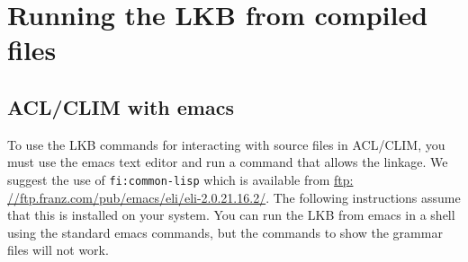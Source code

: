 \documentclass[12pt]{report}
\begin{document}
\section{Running the LKB from compiled files}
\label{compiled}


\subsection{ACL/CLIM with emacs}
\label{acl-emacs}

To use the LKB commands for interacting with source
files in ACL/CLIM, you must use the emacs text editor and
run a command that allows the linkage.  We suggest
the use of {\tt fi:common-lisp} which is available
from \href{ftp: //ftp.franz.com/pub/emacs/eli/eli-2.0.21.16.2/}{ftp: //ftp.franz.com/pub/emacs/eli/eli-2.0.21.16.2/}.  The following
instructions assume that this is installed on your system.
You can run the LKB from emacs in a shell using the standard
emacs commands, but the commands to show the grammar files
will not work.
\end{document}
